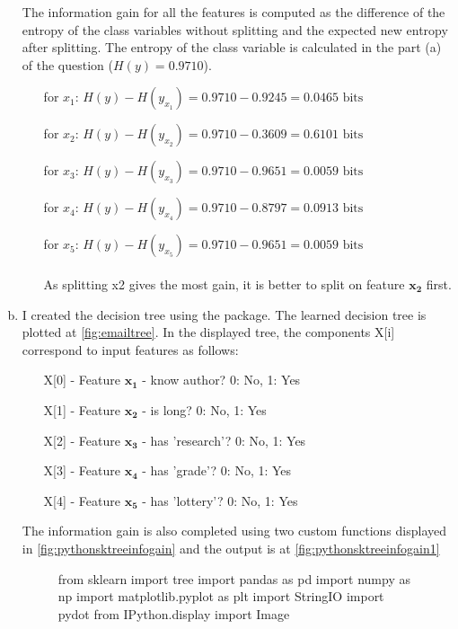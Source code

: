 \documentclass[a4paper, 11pt]{article}
\begin{document}
\begin{enumerate}[(a)]
The information gain for all the features is computed as the difference of the entropy of the class variables without splitting and the expected new entropy after splitting. The entropy of the class variable is calculated in the part (a) of the question ($H(y) = 0.9710$).
\begin{enumerate}
\item[for $x_1$:] $ H(y) - H(y_{x_1}) = 0.9710 - 0.9245 = 0.0465 \text{ bits } $
\item[for $x_2$:] $ H(y) - H(y_{x_2}) = 0.9710 - 0.3609 = 0.6101 \text{ bits } $ 
\item[for $x_3$:] $ H(y) - H(y_{x_3}) = 0.9710 - 0.9651 = 0.0059 \text{ bits } $
\item[for $x_4$:] $ H(y) - H(y_{x_4}) = 0.9710 - 0.8797 = 0.0913 \text{ bits } $
\item[for $x_5$:] $ H(y) - H(y_{x_5}) = 0.9710 - 0.9651 = 0.0059 \text{ bits } $
\\
\\
As splitting x2 gives the most gain, it is better to split on feature $\mathbf{x_2}$ first.
\end{enumerate}

\item I created the decision tree using the  package. The learned decision tree is plotted at \autoref{fig:emailtree}. In the displayed tree, the components X[i] correspond to input features as follows:
\begin{itemize}
\item[] X[0] - Feature $\mathbf{x_1}$ - know author? 0: No, 1: Yes
\item[] X[1] - Feature $\mathbf{x_2}$ - is long? 0: No, 1: Yes
\item[] X[2] - Feature $\mathbf{x_3}$ - has 'research'? 0: No, 1: Yes
\item[] X[3] - Feature $\mathbf{x_4}$ - has 'grade'? 0: No, 1: Yes
\item[] X[4] - Feature $\mathbf{x_5}$ - has 'lottery'? 0: No, 1: Yes
\end{itemize}

The information gain is also completed using two custom functions displayed in \autoref{fig:pythonsktreeinfogain} and the output is at \autoref{fig:pythonsktreeinfogain1}

\begin{figure}
\begin{python}[caption={SVM Primal Form},label={lst:pythonsktree}]
from sklearn import tree
import pandas as pd
import numpy as np
import matplotlib.pyplot as plt
import StringIO
import pydot
from IPython.display import Image


\end{python}
\end{figure}
\end{enumerate}
\end{document}
